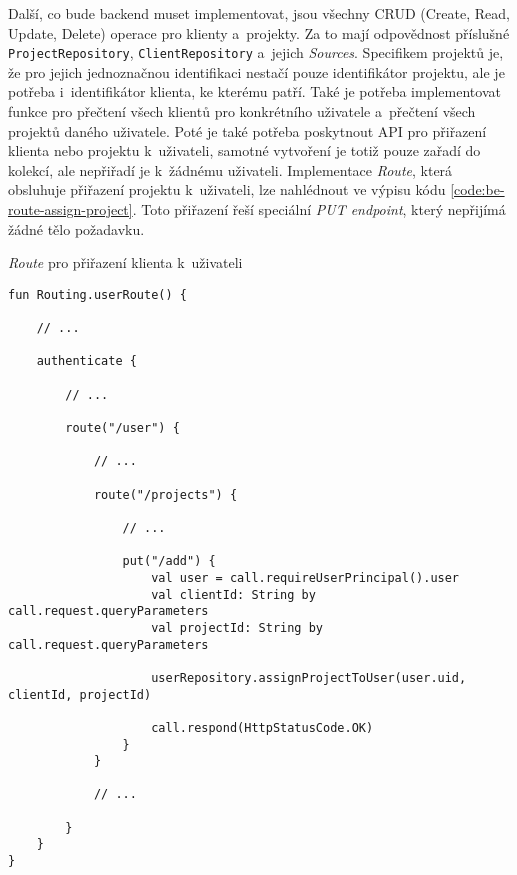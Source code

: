 Další, co bude backend muset implementovat, jsou všechny CRUD (Create, Read, Update, Delete) operace pro klienty a~projekty. Za to mají odpovědnost příslušné \texttt{ProjectRepository}, \texttt{ClientRepository} a~jejich \emph{Sources}. Specifikem projektů je, že pro jejich jednoznačnou identifikaci nestačí pouze identifikátor projektu, ale je potřeba i~identifikátor klienta, ke kterému patří. Také je potřeba implementovat funkce pro přečtení všech klientů pro konkrétního uživatele a~přečtení všech projektů daného uživatele. Poté je také potřeba poskytnout API pro přiřazení klienta nebo projektu k~uživateli, samotné vytvoření je totiž pouze zařadí do kolekcí, ale nepřiřadí je k~žádnému uživateli. Implementace \emph{Route}, která obsluhuje přiřazení projektu k~uživateli, lze nahlédnout ve výpisu kódu \ref{code:be-route-assign-project}. Toto přiřazení řeší speciální \emph{PUT endpoint}, který nepřijímá žádné tělo požadavku.

\begin{listing}
\caption{\emph{Route} pro přiřazení klienta k~uživateli}\label{code:be-route-assign-project}
\begin{verbatim}
fun Routing.userRoute() {

    // ...
    
    authenticate {
    
        // ...
        
        route("/user") {
        
            // ...
            
            route("/projects") {
            
                // ...
                
                put("/add") {
                    val user = call.requireUserPrincipal().user
                    val clientId: String by call.request.queryParameters
                    val projectId: String by call.request.queryParameters

                    userRepository.assignProjectToUser(user.uid, clientId, projectId)

                    call.respond(HttpStatusCode.OK)
                }
            }
            
            // ...
            
        }
    }
}
\end{verbatim}
\end{listing}

